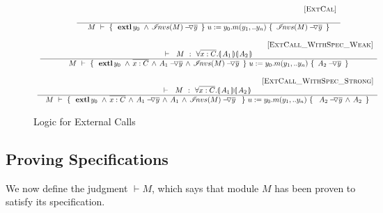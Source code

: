 \small{
\begin{figure}[hbt]
$\begin{array}{c}
\inferruleSD{\hspace{4.7cm} [\sc{ExtCal}]}
	{ 
   	 
        }
	{   \hproves{M} 
						{ \    { \external{y_0} }\,     \wedge \,  \PushAS {y}{\extract{M}}\   }
						{ \ u:=y_0.m(y_1,.. y_n)\    }
						{ \    \PushAS {y}{\extract{M}}   \ }	
}
\\
\\
\inferruleSD{\hspace{4.7cm} [\sc{ExtCall\_WithSpec\_Weak}]}
	{ 
   	\promises M   {\TwoStatesQ {\overline {x:C}} {A_1}{A_2}}
        }
	{   \hproves{M} 
						{ \    { \external{y_0} }\, \wedge \, \overline {x:C}  \, \wedge \,  \PushAS  {y}{  A_1} \,   \wedge \,  \PushAS {y}{\extract{M}}\   }
						{ \ u:=y_0.m(y_1,.. y_n)\    }
						{ \ \PushAS  {y} { A_2}     \ }	
}
\\
\\
\inferruleSD{\hspace{4.7cm}[\sc{ExtCall\_WithSpec\_Strong}]}
	{        	
	\promises M   {\TwoStatesQ {\overline {x:C}} {A_1}{A_2}}
   	}
	{   \hproves{M} 
						{ \  {\external{y_0}  } \, \wedge\, \overline {x:C}\, \wedge\,  \PushAS  {y} { A_1} \, \wedge\,  A_1\, \wedge\,  \PushAS {y}{\extract{M}}\   \  }
						{ \ u:=y_0.m(y_1,.. y_n)\    }
						{ \  \ \PushAS  {y} { A_2}\,  \wedge\, A_2 \  }	
}\
\\
\end{array}
$
\caption{Logic for External Calls}
\label{f:external:calls}
\end{figure}
}




\subsection{Proving \SpecLang Specifications}

We now define the judgment $\vdash M$, which says that module $M$ has been proven to satisfy its specification.

